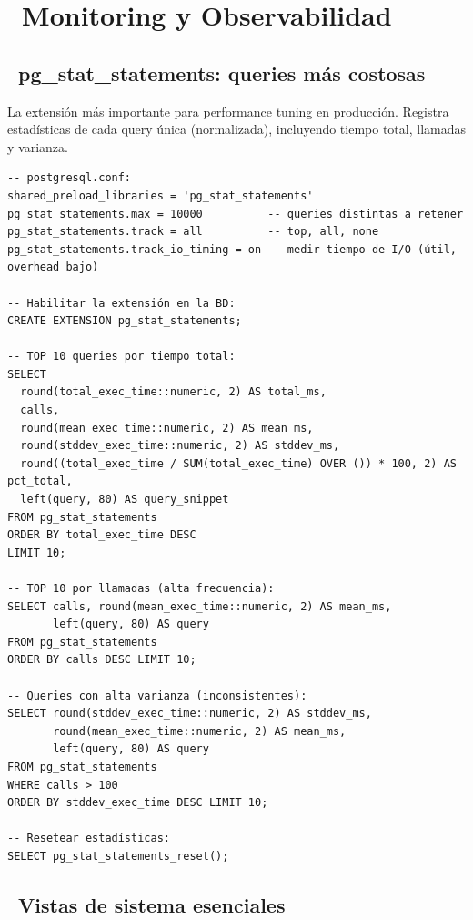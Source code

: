 \chapter[Monitoring y Observabilidad]{~Monitoring y Observabilidad}

\section[pg\_stat\_statements: queries más costosas]{~pg\_stat\_statements: queries más costosas}

La extensión más importante para performance tuning en producción.
Registra estadísticas de cada query única (normalizada), incluyendo tiempo total, llamadas y varianza.

\begin{lstlisting}[caption={Setup y uso de pg\_stat\_statements}]
-- postgresql.conf:
shared_preload_libraries = 'pg_stat_statements'
pg_stat_statements.max = 10000          -- queries distintas a retener
pg_stat_statements.track = all          -- top, all, none
pg_stat_statements.track_io_timing = on -- medir tiempo de I/O (útil, overhead bajo)

-- Habilitar la extensión en la BD:
CREATE EXTENSION pg_stat_statements;

-- TOP 10 queries por tiempo total:
SELECT
  round(total_exec_time::numeric, 2) AS total_ms,
  calls,
  round(mean_exec_time::numeric, 2) AS mean_ms,
  round(stddev_exec_time::numeric, 2) AS stddev_ms,
  round((total_exec_time / SUM(total_exec_time) OVER ()) * 100, 2) AS pct_total,
  left(query, 80) AS query_snippet
FROM pg_stat_statements
ORDER BY total_exec_time DESC
LIMIT 10;

-- TOP 10 por llamadas (alta frecuencia):
SELECT calls, round(mean_exec_time::numeric, 2) AS mean_ms,
       left(query, 80) AS query
FROM pg_stat_statements
ORDER BY calls DESC LIMIT 10;

-- Queries con alta varianza (inconsistentes):
SELECT round(stddev_exec_time::numeric, 2) AS stddev_ms,
       round(mean_exec_time::numeric, 2) AS mean_ms,
       left(query, 80) AS query
FROM pg_stat_statements
WHERE calls > 100
ORDER BY stddev_exec_time DESC LIMIT 10;

-- Resetear estadísticas:
SELECT pg_stat_statements_reset();
\end{lstlisting}

\section[Vistas de sistema esenciales]{~Vistas de sistema esenciales}

